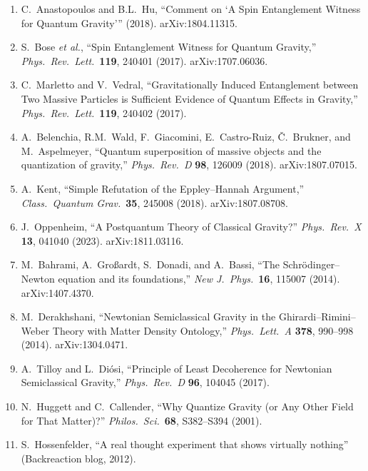\documentclass[12pt,a4paper]{article}
\begin{document}
\begin{enumerate}
\item C.\ Anastopoulos and B.L.\ Hu, ``Comment on `A Spin Entanglement Witness for Quantum Gravity'\thinspace'' (2018). arXiv:1804.11315.

\item S.\ Bose \textit{et al.}, ``Spin Entanglement Witness for Quantum Gravity,'' \textit{Phys.\ Rev.\ Lett.}\ \textbf{119}, 240401 (2017). arXiv:1707.06036.

\item C.\ Marletto and V.\ Vedral, ``Gravitationally Induced Entanglement between Two Massive Particles is Sufficient Evidence of Quantum Effects in Gravity,'' \textit{Phys.\ Rev.\ Lett.}\ \textbf{119}, 240402 (2017).

\item A.\ Belenchia, R.M.\ Wald, F.\ Giacomini, E.\ Castro-Ruiz, \v{C}.\ Brukner, and M.\ Aspelmeyer, ``Quantum superposition of massive objects and the quantization of gravity,'' \textit{Phys.\ Rev.\ D} \textbf{98}, 126009 (2018). arXiv:1807.07015.

\item A.\ Kent, ``Simple Refutation of the Eppley--Hannah Argument,'' \textit{Class.\ Quantum Grav.}\ \textbf{35}, 245008 (2018). arXiv:1807.08708.

\item J.\ Oppenheim, ``A Postquantum Theory of Classical Gravity?'' \textit{Phys.\ Rev.\ X} \textbf{13}, 041040 (2023). arXiv:1811.03116.

\item M.\ Bahrami, A.\ Gro\ss ardt, S.\ Donadi, and A.\ Bassi, ``The Schr\"odinger--Newton equation and its foundations,'' \textit{New J.\ Phys.}\ \textbf{16}, 115007 (2014). arXiv:1407.4370.

\item M.\ Derakhshani, ``Newtonian Semiclassical Gravity in the Ghirardi--Rimini--Weber Theory with Matter Density Ontology,'' \textit{Phys.\ Lett.\ A} \textbf{378}, 990--998 (2014). arXiv:1304.0471.

\item A.\ Tilloy and L.\ Di\'osi, ``Principle of Least Decoherence for Newtonian Semiclassical Gravity,'' \textit{Phys.\ Rev.\ D} \textbf{96}, 104045 (2017).

\item N.\ Huggett and C.\ Callender, ``Why Quantize Gravity (or Any Other Field for That Matter)?'' \textit{Philos.\ Sci.}\ \textbf{68}, S382--S394 (2001).

\item S.\ Hossenfelder, ``A real thought experiment that shows virtually nothing'' (Backreaction blog, 2012).


\end{enumerate}
\end{document}
